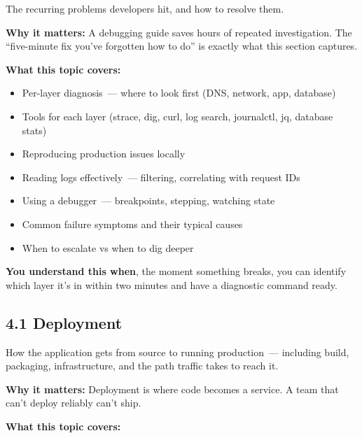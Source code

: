 The recurring problems developers hit, and how to resolve them.

\textbf{Why it matters:} A debugging guide saves hours of repeated investigation. The ``five-minute fix you've forgotten how to do'' is exactly what this section captures.

\textbf{What this topic covers:}

\begin{itemize}
\tightlist
\item
  Per-layer diagnosis~--- where to look first (DNS, network, app, database)
\item
  Tools for each layer (strace, dig, curl, log search, journalctl, jq, database stats)
\item
  Reproducing production issues locally
\item
  Reading logs effectively~--- filtering, correlating with request IDs
\item
  Using a debugger~--- breakpoints, stepping, watching state
\item
  Common failure symptoms and their typical causes
\item
  When to escalate vs when to dig deeper
\end{itemize}

\noindent{}\textbf{You understand this when}, the moment something breaks, you can identify which layer it's in within two minutes and have a diagnostic command ready.

\label{project-planning-guide:section-4--operational-guide}

\subsection*{4.1 Deployment}\label{project-planning-guide:41-deployment}

How the application gets from source to running production~--- including build, packaging, infrastructure, and the path traffic takes to reach it.

\textbf{Why it matters:} Deployment is where code becomes a service. A team that can't deploy reliably can't ship.

\textbf{What this topic covers:}

